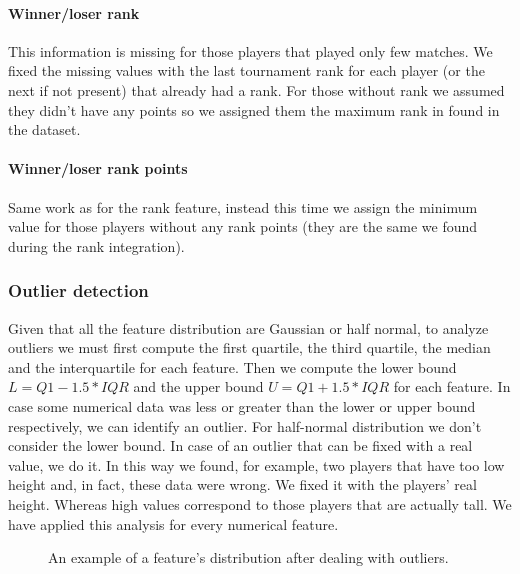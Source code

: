 \paragraph{Winner/loser rank} This information is missing for those players that played only few matches. We fixed the missing values with the last tournament rank for each player (or the next if not present) that already had a rank. For those without rank we assumed they didn't have any points so we assigned them the maximum rank in found in the dataset.

\paragraph{Winner/loser rank points} Same work as for the rank feature, instead this time we assign the minimum value for those players without any rank points (they are the same we found during the rank integration).

\subsubsection{Outlier detection}
Given that all the feature distribution are Gaussian or half normal, to analyze outliers we must first compute the first quartile, the third quartile, the median and the interquartile for each feature. Then we compute the lower bound $L=Q1 - 1.5 * IQR$ and the upper bound $U=Q1 + 1.5 * IQR$ for each feature. In case some numerical data was less or greater than the lower or upper bound respectively, we can identify an outlier. For half-normal distribution we don't consider the lower bound. In case of an outlier that can be fixed with a real value, we do it. In this way we found, for example, two players that have too low height and, in fact, these data were wrong. We fixed it with the players' real height. Whereas high values correspond to those players that are actually tall. We have applied this analysis for every numerical feature.
\begin{figure}[H]
    \centering
    \caption{An example of a feature's distribution after dealing with outliers.}
    \label{fig:before_and_after_detection}
\end{figure}


